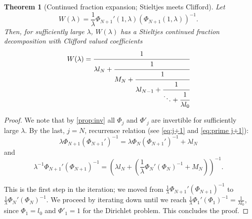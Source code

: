 \documentclass[10pt,a4paper]{article}
\numberwithin{equation}{section}
\theoremstyle{plain}
\newtheorem{theorem}{Theorem}[section]
\theoremstyle{definition}
\renewcommand{\l}{\lambda}
\begin{document}
\begin{theorem}[Continued fraction expansion; Stieltjes meets Clifford] \label{thm:SCfrac}
Let 
\begin{equation} 
W(\lambda)= \frac{1}{\l} \Phi_{N+1}'(1,\l)(\Phi_{N+1}(1,\l))^{-1}. 
\end{equation}
Then, for sufficiently large $\lambda$, $W(\lambda)$ has 
a Stieltjes continued fraction decomposition with 
Clifford valued coefficients
\begin{equation} \label{eq:SCfrac}
W(\lambda)=\cfrac{1}{\lambda l_N +\cfrac{1}{M_{N}+\cfrac{1}{\lambda l_{N-1}+\cfrac{1}{\ddots+\cfrac{1}{\lambda l_0}}}}}
\end{equation}
\end{theorem}
\begin{proof}
We note that by \autoref{prop:inv} all $\Phi_j$ and $\Phi'_j$ are invertible for sufficiently large $\lambda$.  By the last, $j=N$, recurrence relation (see \eqref{eq:j+1} and 
\eqref{eq:prime j+1}): 
\begin{equation*} 
\l \Phi_{N+1}(\Phi_{N+1}')^{-1}=\l \Phi_N(\Phi_{N+1}')^{-1}+\l l_N
\end{equation*}
and
\begin{equation*} 
\l^{-1} \Phi_{N+1}' (\Phi_{N+1})^{-1}=(\l l_N+(\frac1\lambda \Phi_N'(\Phi_N)^{-1}+M_N))^{-1}. 
\end{equation*} 

This is the first step in the iteration; we moved from $\frac1\l \Phi_{N+1}'(\Phi_{N+1})^{-1}$ to $\frac1\lambda \Phi_{N}'(\Phi_{N})^{-1}$.  We proceed by iterating down until we reach $\frac1\l \Phi_1'(\Phi_{1})^{-1}=\frac{1}{\l l_0}$, since
$\Phi_1=l_0$ and $\Phi'_1=1$ for the Dirichlet problem.   This concludes the proof.  
\end{proof}
\end{document}
